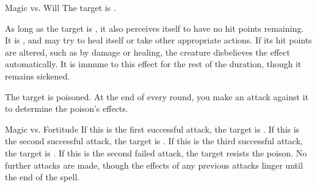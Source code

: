 \begin{spellheader}
    \spellrng{\rngmed}
    \begin{spelltargetinginfo}
    \end{spelltargetinginfo}
    \begin{spelleffects}
    \end{spelleffects}
\end{spellheader}
\begin{spellcontent}
    \begin{spellattack}{Magic vs. Will}
        \spellsuccess The target is \sickened.

        As long as the target is \bloodied, it also perceives itself to have no hit points remaining. It is \staggered, and may try to heal itself or take other appropriate actions. If its hit points are altered, such as by damage or healing, the creature disbelieves the effect automatically. It is immune to this effect for the rest of the duration, though it remains sickened.
    \end{spellattack}
    \spelldur{\durshort}
\end{spellcontent}
\begin{spellfooter}

\end{spellfooter}

\begin{spellheader}
    \spellrng{\rngclose}
    \begin{spelltargetinginfo}
    \end{spelltargetinginfo}
    \begin{spelleffects}
    \end{spelleffects}
\end{spellheader}
\begin{spellcontent}
    \spelleffect The target is poisoned. At the end of every round, you make an attack against it to determine the poison's effects.
    \begin{spellattack}{Magic vs. Fortitude}
        \spellsuccess If this is the first successful attack, the target is \sickened. If this is the second successful attack, the target is \staggered. If this is the third successful attack, the target is \paralyzed.
        \spellfailure If this is the second failed attack, the target resists the poison. No further attacks are made, though the effects of any previous attacks linger until the end of the spell.
    \end{spellattack}
\end{spellcontent}
\begin{spellfooter}

\end{spellfooter}

